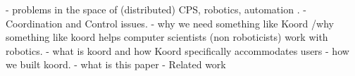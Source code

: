 


    - problems in the space of (distributed) CPS, robotics, automation .
    - Coordination and Control issues. 
    - why we need something like Koord /why something like koord helps computer scientists (non roboticists) work with robotics. 
    - what is koord and how Koord specifically accommodates users
    - how we built koord. 
    - what is this paper
    - Related work
